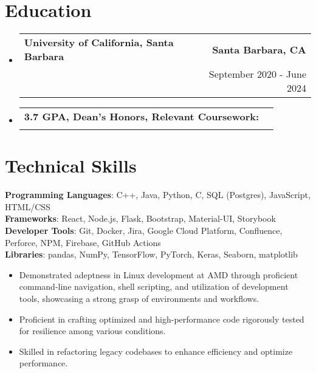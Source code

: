 \documentclass[letterpaper,11pt]{article}
\makeatletter
\newcommand{\resumeItem}[1]{
  \item\small{
    {#1 \vspace{-2pt}}
  }
}
\newcommand{\resumeSubheading}[4]{
  \vspace{-2pt}\item
    \begin{tabular*}{0.97\textwidth}[t]{l@{\extracolsep{\fill}}r}
      \textbf{#1} & #2 \\
      \text{#3} & #4 \\
    \end{tabular*}\vspace{-7pt}
}
\newcommand{\resumeSubHeadingListStart}{\begin{itemize}[leftmargin=0.15in, label={}]}
\newcommand{\resumeSubHeadingListEnd}{\end{itemize}}
\newcommand{\resumeItemListStart}{\begin{itemize}}
\newcommand{\resumeItemListEnd}{\end{itemize}\vspace{-5pt}}
\makeatother
\begin{document}
\section{\textbf{Education}}
  \resumeSubHeadingListStart
    \resumeSubheading
      {University of California, Santa Barbara}{\textbf{Santa Barbara, CA}}
      {Bachelor of Science in Computer Engineering}{September 2020 - June 2024}
    \resumeSubheading
      {3.7 GPA, Dean's Honors, Relevant Coursework:}{}
      {\small{Data Structures, Algorithms, Operating Systems, Applied Machine Learning and AI, Embedded Systems}}{}
  \resumeSubHeadingListEnd

%
\section{Technical Skills}
 \begin{itemize}[leftmargin=0.15in, label={}]
    \small{\item{
     \textbf{Programming Languages}{: C++, Java, Python, C, SQL (Postgres), JavaScript, HTML/CSS} \\
     \textbf{Frameworks}{: React, Node.js, Flask, Bootstrap, Material-UI, Storybook } \\
     \textbf{Developer Tools}{: Git, Docker, Jira, Google Cloud Platform, Confluence, Perforce, NPM, Firebase, GitHub Actions } \\
     \textbf{Libraries}{: pandas, NumPy, TensorFlow, PyTorch, Keras, Seaborn, matplotlib } \\
     \resumeItemListStart
            \resumeItem{Demonstrated adeptness in Linux development at AMD through proficient command-line navigation, shell scripting, and utilization of development tools, showcasing a strong grasp of environments and workflows.}
            \resumeItem{Proficient in crafting optimized and high-performance code rigorously tested for resilience among various conditions.}
            \resumeItem{Skilled in refactoring legacy codebases to enhance efficiency and optimize performance.}
    \resumeItemListEnd
    }}
 \end{itemize}


\end{document}
